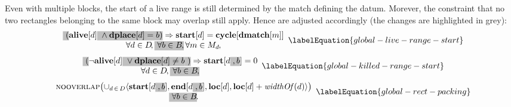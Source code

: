 Even with multiple \glspl{block}, the start of a \gls{live range} is still
determined by the \gls{match} defining the \gls{datum}.
%
Morever, the \gls{constraint} that no two rectangles belonging to the same
\gls{block} may overlap still apply.
%
Hence  are adjusted accordingly (the changes are highlighted in
grey):
%
\begin{equation}
  \begin{array}{c}
    \hlDiff{(}
      \mVar{alive}[d]
      \hlDiff{
        \mbox{}
        \mAnd
        \mVar{dplace}[d] = b
    )}
    \mImp
    \mVar{start}[d] = \mVar{cycle}[\mVar{dmatch}[m]] \\
    \forall d \in \mDataSet \!,
    \hlDiff{\forall b \in \mBlockSet \hspace{-1pt},} \,
    \forall m \in \mMatchSet[d] \hspace{-.8pt},
  \end{array}
  \labelEquation{global-live-range-start}
\end{equation}
%
\begin{equation}
  \begin{array}{c}
    \hlDiff{(}
      \neg\mVar{alive}[d]
      \hlDiff{
        \mbox{}
        \mOr
        \mVar{dplace}[d] \neq b
      }
    \hlDiff{)}
    \mImp
    \mVar{start}[d \hlDiff{\hspace{-.4pt}, b}] = 0 \\
    \forall d \in \mDataSet \hspace{-1pt},
    \hlDiff{\forall b \in \mBlockSet \hspace{-1pt},}
  \end{array}
  \labelEquation{global-killed-range-start}
\end{equation}
%
\begin{equation}
  \begin{array}{c}
    \mNoOverlap\!
    \left(
      \cup_{d \,\in\, \mDataSet}
        \mTuple{
           \mVar{start}[d \hlDiff{\hspace{-.4pt}, b}],
           \mVar{end}[d \hlDiff{\hspace{-.4pt}, b}],
           \mVar{loc}[d],
           \mVar{loc}[d] + \mWidthOf(d)
        }
    \right) \\
    \hlDiff{\forall b \in \mBlockSet} \hspace{-1pt}.
  \end{array}
  \labelEquation{global-rect-packing}
\end{equation}

